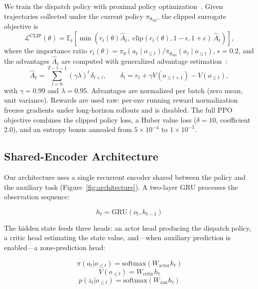 \documentclass{ieeeaccess}
\begin{document}
We train the dispatch policy with proximal policy
optimization~\cite{schulman2017ppo}. Given trajectories collected
under the current policy $\pi_{\theta_{\mathrm{old}}}$, the clipped
surrogate objective is
\begin{equation}
\mathcal{L}^{\mathrm{CLIP}}(\theta) = \mathbb{E}_t\!\left[
\min\!\left( r_t(\theta)\hat{A}_t,\;
\mathrm{clip}(r_t(\theta), 1-\epsilon, 1+\epsilon)\,\hat{A}_t
\right) \right],
\end{equation}
where the importance ratio $r_t(\theta) =
\pi_\theta(a_t \mid o_{\le t}) / \pi_{\theta_{\mathrm{old}}}(a_t \mid
o_{\le t})$, $\epsilon = 0.2$, and the advantages $\hat{A}_t$ are
computed with generalized advantage estimation~\cite{schulman2016gae}:
\begin{equation}
\hat{A}_t = \sum_{l=0}^{T-t-1} (\gamma \lambda)^l\, \delta_{t+l},
\qquad
\delta_t = r_t + \gamma V(o_{\le t+1}) - V(o_{\le t}),
\end{equation}
with $\gamma = 0.99$ and $\lambda = 0.95$. Advantages are normalized
per batch (zero mean, unit variance). Rewards are used raw: per-env
running reward normalization freezes gradients under long-horizon
rollouts and is disabled. The full PPO objective
combines the clipped policy loss, a Huber value loss ($\delta = 10$,
coefficient 2.0), and an entropy bonus annealed from
$5 \times 10^{-4}$ to $1 \times 10^{-5}$.

\subsection{Shared-Encoder Architecture}

Our architecture uses a single recurrent encoder shared between the
policy and the auxiliary task (Figure~\ref{fig:architecture}).
A two-layer GRU processes the observation sequence:

\begin{equation}
h_t = \text{GRU}(o_t, h_{t-1})
\end{equation}

The hidden state feeds three heads: an actor head producing the
dispatch policy, a critic head estimating the state value, and---when
auxiliary prediction is enabled---a zone-prediction head:

\begin{equation}
\pi(a_t | o_{\le t}) = \text{softmax}(W_{\text{actor}} h_t)
\end{equation}
\begin{equation}
V(o_{\le t}) = W_{\text{critic}} h_t
\end{equation}
\begin{equation}
p(z_t | o_{\le t}) = \text{softmax}(W_{\text{aux}} h_t)
\end{equation}
\end{document}
